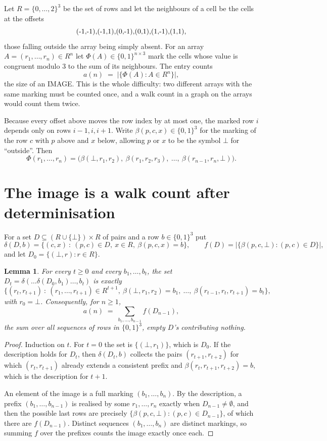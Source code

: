 \documentclass[11pt,a4paper]{article}
\theoremstyle{plain}
\newtheorem{lemma}[theorem]{Lemma}
\theoremstyle{definition}
\begin{document}
Let $R=\{0,\dots,2\}^{3}$ be the set of rows and let the neighbours of a cell be the
cells at the offsets
\[
$(-1,-1)$, $(-1,1)$, $(0,-1)$, $(0,1)$, $(1,-1)$, $(1,1)$,
\]
those falling outside the array being simply absent. For an array
$A=(r_1,\dots,r_n)\in R^n$ let $\Phi(A)\in\{0,1\}^{n\times3}$ mark the cells whose value
is congruent modulo 3 to the sum of its neighbours. The entry counts
\[
a(n)\;=\;\bigl|\{\Phi(A):A\in R^n\}\bigr| ,
\]
the size of an IMAGE. This is the whole difficulty: two different arrays with the same marking
must be counted once, and a walk count in a graph on the arrays would count them twice.

Because every offset above moves the row index by at most one, the marked row $i$ depends only
on rows $i-1,i,i+1$. Write $\beta(p,c,x)\in\{0,1\}^{3}$ for the marking of the row $c$
with $p$ above and $x$ below, allowing $p$ or $x$ to be the symbol $\bot$ for ``outside''.
Then
\[
\Phi(r_1,\dots,r_n)=\bigl(\beta(\bot,r_1,r_2),\ \beta(r_1,r_2,r_3),\ \dots,\
\beta(r_{n-1},r_n,\bot)\bigr).
\]

\section{The image is a walk count after determinisation}

For a set $D\subseteq(R\cup\{\bot\})\times R$ of pairs and a row $b\in\{0,1\}^{3}$ put
\[
\delta(D,b)=\{(c,x)\ :\ (p,c)\in D,\ x\in R,\ \beta(p,c,x)=b\},\qquad
f(D)=\bigl|\{\beta(p,c,\bot):(p,c)\in D\}\bigr| ,
\]
and let $D_0=\{(\bot,r):r\in R\}$.

\begin{lemma}\label{lem:det}
For every $t\ge0$ and every $b_1,\dots,b_t$, the set
$D_t=\delta(\dots\delta(D_0,b_1)\dots,b_t)$ is exactly
\[
\{(r_t,r_{t+1})\ :\ (r_1,\dots,r_{t+1})\in R^{t+1},\ \beta(\bot,r_1,r_2)=b_1,\ \dots,\
\beta(r_{t-1},r_t,r_{t+1})=b_t\} ,
\]
with $r_0=\bot$. Consequently, for $n\ge1$,
\[
a(n)\;=\;\sum_{b_1,\dots,b_{n-1}}f(D_{n-1}),
\]
the sum over all sequences of rows in $\{0,1\}^{3}$, empty $D$'s contributing nothing.
\end{lemma}

\begin{proof}
Induction on $t$. For $t=0$ the set is $\{(\bot,r_1)\}$, which is $D_0$. If the description
holds for $D_t$, then $\delta(D_t,b)$ collects the pairs $(r_{t+1},r_{t+2})$ for which
$(r_t,r_{t+1})$ already extends a consistent prefix and
$\beta(r_t,r_{t+1},r_{t+2})=b$, which is the description for $t+1$.

An element of the image is a full marking $(b_1,\dots,b_n)$. By the description, a prefix
$(b_1,\dots,b_{n-1})$ is realised by some $r_1,\dots,r_n$ exactly when $D_{n-1}\neq
\emptyset$, and then the possible last rows are precisely
$\{\beta(p,c,\bot):(p,c)\in D_{n-1}\}$, of which there are $f(D_{n-1})$. Distinct
sequences $(b_1,\dots,b_n)$ are distinct markings, so summing $f$ over the prefixes counts the
image exactly once each.
\end{proof}
\end{document}
